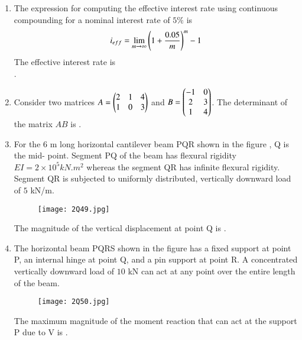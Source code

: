 \documentclass[journal,12pt,onecolumn]{article}
\theoremstyle{remark}
\begin{document}
\begin{enumerate}
    \item The expression for computing the effective interest rate  using continuous
    compounding for a nominal interest rate of $5\%$ is
    \begin{align}
    i_{eff} = \lim_{m \to \infty} \left(1 + \frac{0.05}{m}\right)^m - 1
    \end{align}
    The effective interest rate  is \underline{\hspace{2cm}} \\
    .
    
    \hfill{}

    \item Consider two matrices $A = \begin{pmatrix}2 & 1 & 4 \\ 1 & 0 & 3\end{pmatrix}$ and $B = \begin{pmatrix}-1 & 0 \\ 2 & 3 \\ 1 & 4\end{pmatrix}$.
    The determinant of the matrix $AB$ is \underline{\hspace{2cm}} .
    
    \hfill{}

    \item For the $6$ m long horizontal cantilever beam PQR shown in the figure , Q is the mid-
    point. Segment PQ of the beam has flexural rigidity $EI = 2 \times 10^5 kN. m^2$
    whereas the segment QR has infinite flexural rigidity. Segment QR is subjected to
    uniformly distributed, vertically downward load of $5$ kN/m.
    \begin{figure}[H]
        \centering
        \texttt{[image: 2Q49.jpg]}
        \caption{}
        \label{fig:q49}
    \end{figure}
    
    The magnitude of the vertical displacement  at point Q is \underline{\hspace{2cm}} .
    
    \hfill{}

    \item The horizontal beam PQRS shown in the figure  has a fixed support at point P, an
    internal hinge at point Q, and a pin support at point R. A concentrated vertically
    downward load  of $10$ kN can act at any point over the entire length of the beam.
    \begin{figure}[H]
        \centering
        \texttt{[image: 2Q50.jpg]}
        \caption{}
        \label{fig:q50}
    \end{figure}    
    The maximum magnitude of the moment reaction  that can act at the
    support P due to V is \underline{\hspace{2cm}} .
    

\end{enumerate}
\end{document}
